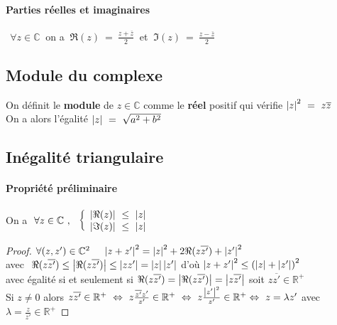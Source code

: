  \paragraph{Parties réelles et imaginaires} $~~\forall z\in\mathbb{C} ~$ on a $~\Re (z) ~=~ \frac{z+\overline{z}}{2} ~$ et $~\Im (z) ~=~ \frac{z-\overline{z}}{2}$
 \subsection{Module du complexe}
 On définit le \textbf{module} de $z\in\mathbb{C}$ comme le \textbf{réel} positif qui vérifie $\left\vert z \right\vert^2 ~=~ z\overline{z}$\\On a alors l'égalité $\left\vert z \right\vert ~=~ \sqrt{a^2 + b^2}$
 \subsection{Inégalité triangulaire}
 \paragraph{Propriété préliminaire} On a $~\forall z\in\mathbb{C} ~,~~ \left\{ \ar* \abs{\Re (z)} ~\leq ~ \abs{z} \\ \abs{\Im (z)} ~\leq ~ \abs{z} \ar\right.$\vspace*{5pt}\\
 \begin{proof}
 $\forall (z,z') \in\mathbb{C}^2  ~~~~ \left\vert z+z' \right\vert^2 = \left\vert z \right\vert^2 + 2\Re (z\overline{z'}) + \left\vert z' \right\vert^2$ \\ avec $~\Re (z\overline{z'}) \leq \left\vert \Re (z\overline{z'}) \right\vert \leq \left\vert zz' \right\vert = \left\vert z \right\vert\left\vert z' \right\vert$ d'où $\left\vert z+z' \right\vert^2 \leq \left(\left\vert z \right\vert + \left\vert z' \right\vert \right)^2$\vspace*{5pt}\\
 avec égalité si et seulement si $\Re (z\overline{z'}) = \left\vert \Re (z\overline{z'}) \right\vert = \left\vert z\overline{z'} \right\vert$ soit $z\overline{z'}\in\mathbb{R}^+$\vspace*{5pt}\\ Si $z\neq 0$ alors $z\overline{z'}\in\mathbb{R}^+ ~\Leftrightarrow ~ z\frac{\overline{z'} z'}{z'}\in\mathbb{R}^+ ~\Leftrightarrow ~ z\frac{\left\vert z' \right\vert^2}{z'} \in\mathbb{R}^+ \\ \Leftrightarrow ~z = \lambda z'$ avec $ \lambda = \frac{z}{z'} \in\mathbb{R}^+$
 \end{proof} ${}$\\
